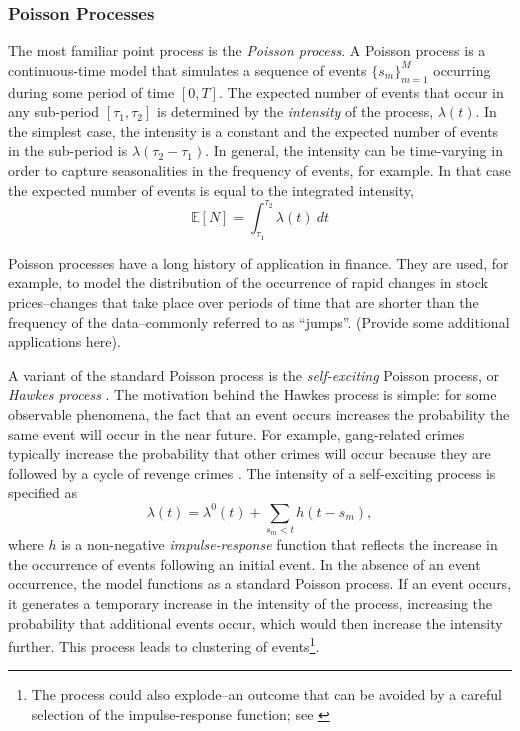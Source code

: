 \subsubsection{Poisson Processes}
The most familiar point process is the \textit{Poisson process}. A Poisson process is a continuous-time model that simulates a sequence of events $\{s_m\}_{m=1}^M$ occurring during some period of time $\left[0,T\right]$. The expected number of events that occur in any sub-period $[\tau_1, \tau_2]$ is determined by the \textit{intensity} of the process, $\lambda(t)$. In the simplest case, the intensity is a constant and the expected number of events in the sub-period is $\lambda (\tau_2 - \tau_1)$. In general, the intensity can be time-varying in order to capture seasonalities in the frequency of events, for example. In that case the expected number of events is equal to the integrated intensity,
\begin{equation}
	\mathbb{E} \left[ N \right] = \int_{\tau_1}^{\tau_2} \lambda(t) \ dt
\end{equation}

Poisson processes have a long history of application in finance. They are used, for example, to model the distribution of the occurrence of rapid changes in stock prices--changes that take place over periods of time that are shorter than the frequency of the data--commonly referred to as ``jumps''. (Provide some additional applications here).

A variant of the standard Poisson process is the \textit{self-exciting} Poisson process, or \textit{Hawkes process} \cite{}. The motivation behind the Hawkes process is simple: for some observable phenomena, the fact that an event occurs increases the probability the same event will occur in the near future. For example, gang-related crimes typically increase the probability that other crimes will occur because they are followed by a cycle of revenge crimes \cite{Cho2013}. The intensity of a self-exciting process is specified as
\begin{equation}
	\lambda(t) = \lambda^0(t) + \sum_{s_m < t} h(t - s_m),
\end{equation}
where $h$ is a non-negative \textit{impulse-response} function that reflects the increase in the occurrence of events following an initial event. In the absence of an event occurrence, the model functions as a standard Poisson process. If an event occurs, it generates a temporary increase in the intensity of the process, increasing the probability that additional events occur, which would then increase the intensity further. This process leads to clustering of events\footnote{The process could also explode--an outcome that can be avoided by a careful selection of the impulse-response function; see \cite{}}.


